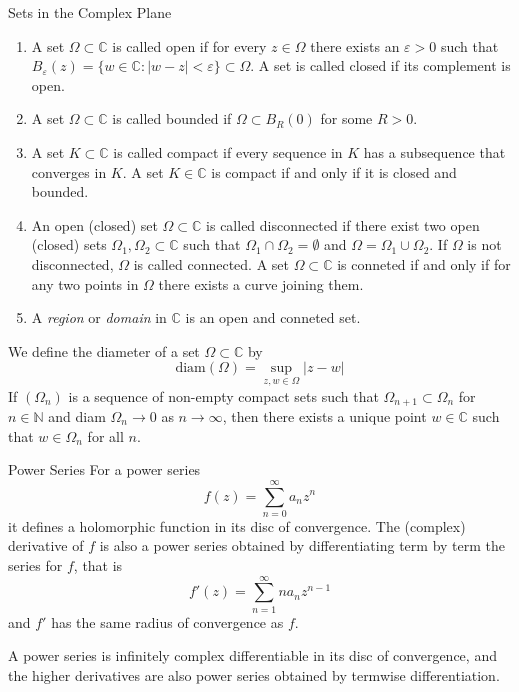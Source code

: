 \documentclass{beamer}
\begin{document}
\begin{frame}
\begin{block}{Sets in the Complex Plane}
\begin{enumerate}
\item A set $\Omega\subset\mathbb{C} $ is called open if for every $z\in\Omega$ there exists an $\varepsilon>0$ such that $B_{\varepsilon}(z)=\lbrace w\in\mathbb{C}:|w-z|<\varepsilon\rbrace\subset\Omega$. A set is called closed if its complement is open.
\item A set $\Omega\subset\mathbb{C}$ is called bounded if $\Omega\subset B_R(0)$ for some $R>0$.
\item A set $K\subset\mathbb{C}$ is called compact if every sequence in $K$ has a subsequence that converges in $K$. A set $K\in\mathbb{C}$ is compact if and only if it is closed and bounded.
\item An open (closed) set $\Omega\subset\mathbb{C}$ is called disconnected if there exist two open (closed) sets $\Omega_1,\Omega_2\subset\mathbb{C}$ such that $\Omega_1\cap\Omega_2=\emptyset$ and $\Omega=\Omega_1\cup\Omega_2$. If $\Omega$ is not disconnected, $\Omega$ is called connected. A set $\Omega\subset\mathbb{C}$ is conneted if and only if for any two points in $\Omega$ there exists a curve joining them.
\item A \textcolor[rgb]{0,0.6,0.3}{\textit{region}} or \textcolor[rgb]{0,0.6,0.3}{\textit{domain}} in $\mathbb{C}$ is an open and conneted set.
\end{enumerate}
\end{block}
\end{frame}

\begin{frame}
\begin{block}{}
We define the diameter of a set $\Omega\subset\mathbb{C}$ by
$$\text{diam}(\Omega)=\sup_{z,w\in\Omega}|z-w|$$
If $(\Omega_n)$ is a sequence of non-empty compact sets such that $\Omega_{n+1}\subset\Omega_n$ for $n\in\mathbb{N}$ and diam $\Omega_n\rightarrow0$ as $n\rightarrow\infty$, then there exists a unique point $w\in\mathbb{C}$ such that $w\in\Omega_n$ for all $n$.
\end{block}
\end{frame}

\begin{frame}
\begin{block}{Power Series}
For a power series
$$f(z)=\sum\limits_{n=0}^{\infty}a_nz^n$$
it defines a holomorphic function in its disc of convergence. The (complex) derivative of $f$ is also a power series obtained by differentiating term by term the series for $f$, that is 
$$f'(z)=\sum\limits_{n=1}^{\infty}na_nz^{n-1}$$
and $f'$ has the same radius of convergence as $f$.
\end{block}
\begin{block}{}
A power series is infinitely complex differentiable in its disc of convergence, and the higher derivatives are also power series obtained by termwise differentiation.
\end{block}
\end{frame}
\end{document}

